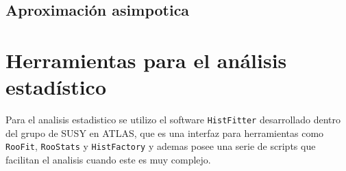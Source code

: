 
\subsection{Aproximación asimpotica}















\section{Herramientas para el análisis estadístico}

Para el analisis estadistico se utilizo el software \texttt{HistFitter} \cite{histfitter}
desarrollado dentro del grupo de SUSY en ATLAS, que es una interfaz para herramientas
como \texttt{RooFit}, \texttt{RooStats}\cite{Moneta:2010pm} y \texttt{HistFactory}
\cite{Cranmer:1456844} y ademas posee una serie de scripts que facilitan el analisis cuando este
es muy complejo.

